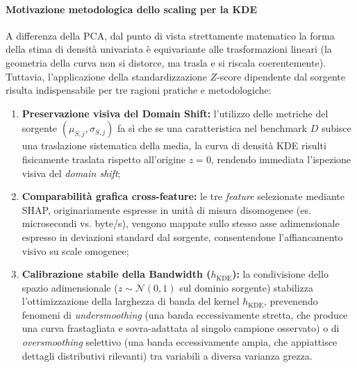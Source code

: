 \paragraph{Motivazione metodologica dello scaling per la KDE}
A differenza della PCA, dal punto di vista strettamente matematico la forma della stima di densità univariata è equivariante alle trasformazioni lineari (la geometria della curva non si distorce, ma trasla e si riscala coerentemente). Tuttavia, l'applicazione della standardizzazione $Z$-score dipendente dal sorgente risulta indispensabile per tre ragioni pratiche e metodologiche:
\begin{enumerate}
    \item \textbf{Preservazione visiva del Domain Shift:} l'utilizzo delle metriche del sorgente $(\mu_{S,j}, \sigma_{S,j})$ fa sì che se una caratteristica nel benchmark $D$ subisce una traslazione sistematica della media, la curva di densità KDE risulti fisicamente traslata rispetto all'origine $z=0$, rendendo immediata l'ispezione visiva del \textit{domain shift};
    \item \textbf{Comparabilità grafica cross-feature:} le tre \textit{feature} selezionate mediante SHAP, originariamente espresse in unità di misura disomogenee (es. microsecondi vs. byte/s), vengono mappate sullo stesso asse adimensionale espresso in deviazioni standard dal sorgente, consentendone l'affiancamento visivo su scale omogenee;
    \item \textbf{Calibrazione stabile della Bandwidth ($h_{\text{KDE}}$):} la condivisione dello spazio adimensionale ($z \sim \mathcal{N}(0,1)$ sul dominio sorgente) stabilizza l'ottimizzazione della larghezza di banda del kernel $h_{\text{KDE}}$, prevenendo fenomeni di \textit{undersmoothing} (una banda eccessivamente stretta, che produce una curva frastagliata e sovra-adattata al singolo campione osservato) o di \textit{oversmoothing} selettivo (una banda eccessivamente ampia, che appiattisce dettagli distributivi rilevanti) tra variabili a diversa varianza grezza.
\end{enumerate}

